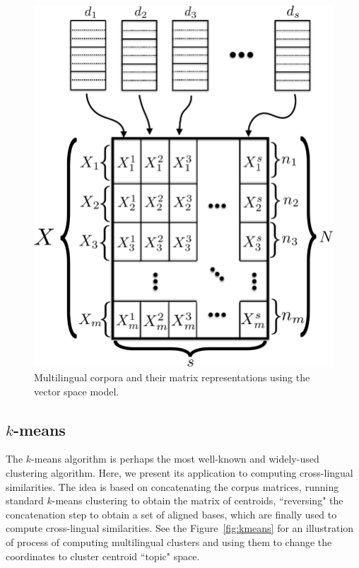 \documentclass[twoside,11pt]{article}
\begin{document}
\begin{figure}[tbp]
\centering
\includegraphics[width=\textwidth]{stacked_matrices.pdf}
\caption{\label{fig:stacked_matrices} Multilingual corpora and their matrix representations using the vector space model.}
\end{figure}


\subsection{$k$-means}\label{sec:kmeans}

The $k$-means algorithm is perhaps the most well-known and widely-used clustering algorithm. Here, we present its application
to computing cross-lingual similarities. The idea is based on concatenating the corpus matrices, running standard $k$-means clustering to obtain the matrix of centroids, ``reversing" the concatenation step to obtain a set of aligned bases, which are finally used to compute cross-lingual similarities. See the Figure~\ref{fig:kmeans} for an illustration of process of computing multilingual clusters and using them to change the coordinates to cluster centroid ``topic" space.
\end{document}
